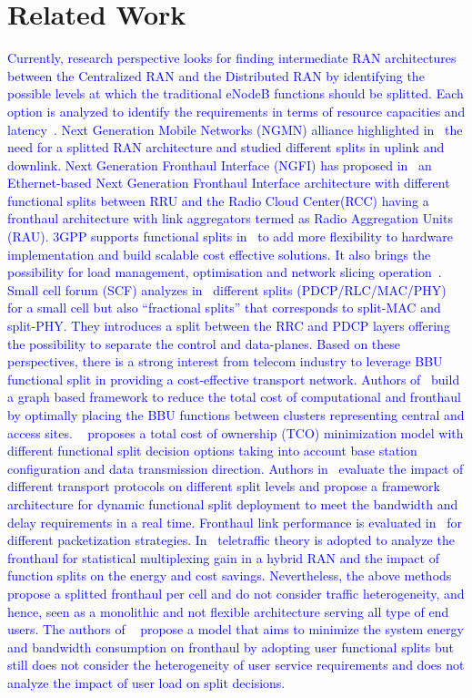 \documentclass[
    a4paper, 
    12pt, onecolumn,
]{article}
\newcommand{\customtodo}[4]{
        \todo[color=#2,inline,size=\small]{
                \ifx&#3&
                        \textbf{#1} #4
                \else
                        \textbf{#1$\Rightarrow$#3} #4
                \fi
        }
}
\newcommand{\IF}[2][]{\customtodo{IF}{blue!20}{#1}{#2}}
\begin{document}
\section{Related Work}
\IF{added SoA} 
\textcolor{blue}{
Currently, research perspective looks for finding intermediate RAN architectures between the Centralized RAN and the Distributed RAN by identifying the possible levels at which the traditional eNodeB functions should be splitted. Each option is analyzed to identify the requirements in terms of resource capacities and latency~\cite{CITE-015, CITE-017, CITE-021}. Next Generation Mobile Networks (NGMN) alliance highlighted in~\cite{CITE-014} the need for a splitted RAN architecture and studied different splits in uplink and downlink. Next Generation Fronthaul Interface (NGFI) has proposed in~\cite{CITE-021} an Ethernet-based Next Generation Fronthaul Interface architecture with different functional splits between RRU and the Radio Cloud Center(RCC) having a fronthaul architecture with link aggregators termed as Radio Aggregation Units (RAU). 3GPP supports functional splits in~\cite{CITE-023} to add more flexibility to hardware implementation and build scalable cost effective solutions. It also brings the possibility for load management, optimisation and network slicing operation~\cite{CITE-024}. Small cell forum (SCF) analyzes in~\cite{CITE-015} different splits (PDCP/RLC/MAC/PHY) for a small cell but also “fractional splits” that corresponds to split-MAC and split-PHY. They introduces a split between the RRC and PDCP layers offering the possibility to separate the control and data-planes.
}
\textcolor{blue}{
Based on these perspectives, there is a strong interest from telecom industry to leverage BBU functional split in providing a cost-effective transport network. Authors of~\cite{CITE-025} build a graph based framework to reduce the total cost of computational and fronthaul by optimally placing  the BBU functions between clusters representing central and access sites. ~\cite{CITE-026} proposes a total cost of ownership (TCO) minimization model with different functional split decision options taking into account base station configuration and data transmission direction. Authors in~\cite{CITE-027} evaluate the impact of different transport protocols on different split levels and propose a framework architecture for dynamic functional split deployment to meet the bandwidth and delay requirements in a real time. Fronthaul link performance is evaluated in~\cite{CITE-011} for different packetization strategies. In~\cite{CITE-018} teletraffic theory is adopted to analyze the fronthaul for statistical multiplexing gain in a hybrid RAN and the impact of function splits on the energy and cost savings. Nevertheless, the above methods propose a splitted fronthaul per cell and do not consider traffic heterogeneity, and hence, seen as a monolithic and not flexible architecture serving all type of end users. The authors of ~\cite{CITE-028} propose a model that aims to minimize the system energy and bandwidth consumption on fronthaul by adopting user functional splits but still does not consider the heterogeneity of user service requirements and does not analyze the impact of user load on split decisions.
}
\end{document}
